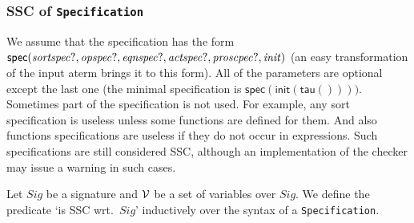 \documentclass[fleqn,a4paper,dvips]{article}
\newcommand{\aterm}[1]{\mathsf{#1}}
\newcommand{\NV}{{\cal V}}
\begin{document}
\subsubsection{SSC of \texttt{Specification}}
We assume that the specification has the form
$\aterm{spec}(\nm{sortspec?},\nm{opspec?},\nm{eqnspec?},\nm{actspec?},\nm{proscpec?},\nm{init})$
(an easy transformation of the input aterm brings it to this form).
All of the parameters are optional except the last one (the minimal specification is
$\aterm{spec}(\aterm{init}(\aterm{tau}())))$.
Sometimes part of the specification is not used. For example, any sort specification is useless
unless some functions are defined for them. And also functions specifications are useless if they do not
occur in expressions. Such specifications are still considered SSC, although an implementation of the checker
may issue a warning in such cases.

Let $Sig$ be a signature and $\NV$ be a set of variables over $Sig$. We
define the predicate `is SSC wrt.\ $Sig$'
inductively over the syntax of a {\tt Specification}.
\end{document}
